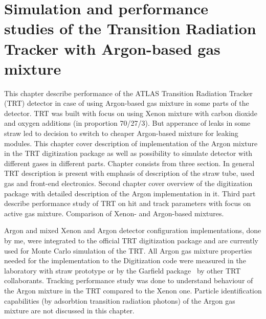 \chapter{Simulation and performance studies of the Transition Radiation Tracker with Argon-based gas mixture}
\label{chap:TRT}


This chapter describe performance of the ATLAS Transition Radiation Tracker (TRT) detector in case of using 
Argon-based gas mixture in some parts of the detector.
TRT was built with focus on using Xenon mixture with carbon dioxide and oxygen additions (in proportion 70/27/3).
But apperance of leaks in some straw led to decision to switch to cheaper Argon-based mixture for leaking modules.
This chapter cover description of implementation of the Argon mixture in the TRT digitization package as well as possibility
to simulate detector with different gases in different parts.
Chapter consists from three section. In  general TRT description is present with emphasis
of description of the straw tube, used gas and front-end electronics.
Second chapter cover overview of the digitization package with detailed description of the Argon implementation in it.
Third part describe performance study of TRT on hit and track parameters with focus on active gas mixture. Comparison of 
Xenon- and Argon-based mixtures.

Argon and mixed Xenon and Argon detector configuration implementations, done by me, were integrated to the official TRT digitization 
package and are currently used for Monte Carlo simulation of the TRT. 
All Argon gas mixture properties needed for the implementation to the Digitization code were measured in the laboratory 
with straw prototype or by the Garfield package~\cite{garfield_program} by other TRT collaborants. 
Tracking performance study was done to understand behaviour of the Argon mixture in the TRT compared to the Xenon one.
Particle identification capabilities (by adsorbtion transition radiation photons) of the Argon gas mixture are not discussed 
in this chapter.

